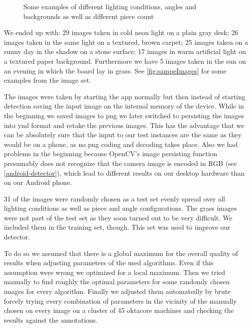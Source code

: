 \begin{figure}
		\caption{Some examples of different lighting conditions, angles and backgrounds as well as different piece count}
		\label{fig:sampeImages}
	\end{figure}

	We ended up with: 29 images taken in cold neon light on a plain gray desk; 26 images taken in the same light on a textured, brown carpet; 25 images taken on a sunny day in the shadow on a stone surface; 17 images in warm artificial light on a textured paper background. Furthermore we have 5 images taken in the sun on an evening in which the board lay in grass. See \autoref{fig:sampeImages} for some examples from the image set.

	The images were taken by starting the app normally but then instead of starting detection saving the input image on the internal memory of the device. While in the beginning we saved images to png we later switched to persisting the images into yml format and retake the previous images. This has the advantage that we can be absolutely sure that the input to our test instances are the same as they would be on a phone, as no png coding and decoding takes place. Also we had problems in the beginning because OpenCV's image persisting function presumably does not recognize that the camera image is encoded in RGB (see \autoref{android-detector}), which lead to different results on our desktop hardware than on our Android phone.

	31 of the images were randomly chosen as a test set evenly spread over all lighting conditions as well as piece and angle configurations. The grass images were not part of the test set as they soon turned out to be very difficult. We included them in the training set, though. This set was used to improve our detector.

	To do so we assumed that there is a global maximum for the overall quality of results when adjusting parameters of the used algorithms. Even if this assumption were wrong we optimized for a local maximum. Then we tried manually to find roughly the optimal parameters for some randomly chosen images for every algorithm. Finally we adjusted them automatedly by brute forcely trying every combination of parameters in the vicinity of the manually chosen on every image on a cluster of 45 oktacore machines and checking the results against the annotations.







